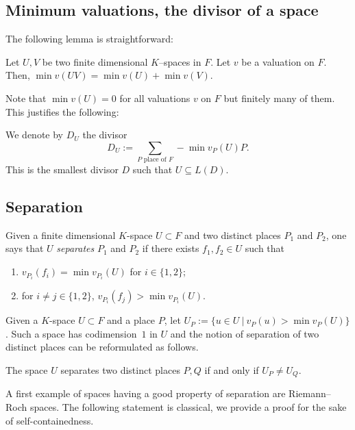 \documentclass[ALCO,Unicode,ThmDefs]{cedram}
\begin{document}
\subsection{Minimum valuations, the divisor of a space}\label{sec:divisor}

The following lemma is straightforward:

\begin{lemm}\label{lem:sum_min_val}
Let $U,V$ be two finite dimensional $K$--spaces in $F$. Let $v$ be a valuation on $F$. Then, $\min v(UV)=\min v(U)+ \min v(V)$.
\end{lemm}

Note that $\min v(U)=0$ for all valuations $v$ on $F$ but finitely many of them. This justifies the following:

\begin{defi}\label{def:DU}
We denote by $D_U$ the divisor
\[
D_U:=\sum_{P\textrm{ place of }F} -\min v_P(U)P.
\]
This is the smallest divisor $D$ such that $U \subseteq L(D)$.
\end{defi}


\subsection{Separation}\label{sec:separation}

\begin{defi}[Separation]
Given a finite dimensional $K$-space $U \subset F$ and two distinct places $P_1$ and $P_2$, one says that $U$ \emph{separates} $P_1$ and $P_2$ if there exists $f_1, f_2 \in U$ such that
\begin{enumerate}
\item $v_{P_i} (f_i)=\min v_{P_i}(U)$ for $i \in \{1,2\}$;
\item for $i \neq j \in \{1,2\}$, $v_{P_i}(f_j) > \min v_{P_i}(U)$.
\end{enumerate}
\end{defi}

Given a $K$-space $U \subset F$ and a place $P$, let $U_P:=\{ u \in U~|~v_P(u) > \min v_P(U)\}$. Such a space has codimension~$1$ in $U$ and the notion of separation of two distinct places can be reformulated as follows.

\begin{lemm}\label{lem:U_pU_Q}
The space $U$ separates two distinct places $P, Q$ if and only if $U_P \neq U_Q$.
\end{lemm}

A first example of spaces having a good property of separation are Riemann--Roch spaces. The following statement is classical, we provide a proof for the sake of self-containedness.
\end{document}
